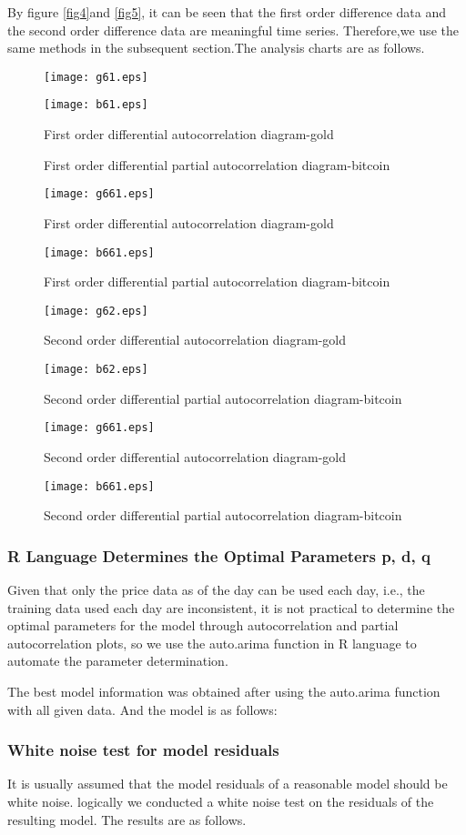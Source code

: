 \documentclass{mcmthesis}
\begin{document}
By figure \ref{fig4}and \ref{fig5}, it can be seen that the first order difference data and the second order difference data are meaningful time series.
Therefore,we use the same methods in the subsequent section.The analysis charts are as follows.

\begin{figure}[htbp]
  \centering
  \texttt{[image: g61.eps]}
  \caption{First order differential autocorrelation diagram-gold}
  \texttt{[image: b61.eps]}
\end{figure}
\begin{figure}[htbp]
  \caption{First order differential partial autocorrelation diagram-bitcoin} 
  \texttt{[image: g661.eps]}
  \caption{First order differential autocorrelation diagram-gold}
  \texttt{[image: b661.eps]}
  \caption{First order differential partial autocorrelation diagram-bitcoin} 
\end{figure}

\begin{figure}[!h]
  \texttt{[image: g62.eps]}
  \caption{Second order differential autocorrelation diagram-gold}
  \texttt{[image: b62.eps]}
  \caption{Second order differential partial autocorrelation diagram-bitcoin} 
  \texttt{[image: g661.eps]}
  \caption{Second order differential autocorrelation diagram-gold}
  \texttt{[image: b661.eps]}
  \caption{Second order differential partial autocorrelation diagram-bitcoin} 
  \label{fig661}
\end{figure}


\subsubsection{R Language Determines the Optimal Parameters p, d, q}
Given that only the price data as of the day can be used each day, i.e., 
the training data used each day are inconsistent,
it is not practical to determine the optimal parameters for the model through autocorrelation and partial autocorrelation plots, 
so we use the auto.arima function in R language to automate the parameter determination.

The best model information was obtained after using the auto.arima function with all given data.
And the model is as follows:



\subsubsection{White noise test for model residuals}
It is usually assumed that the model residuals of a reasonable model should be white noise.
logically we conducted a white noise test on the residuals of the resulting model.
The results are as follows.
\end{document}
